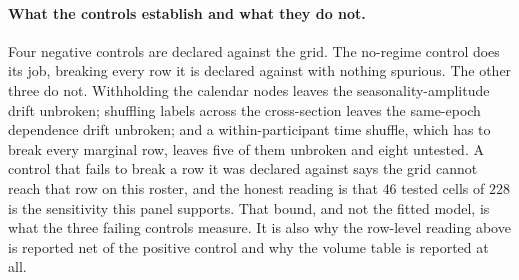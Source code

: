 \paragraph{What the controls establish and what they do not.}
Four negative controls are declared against the grid. The no-regime control
does its job, breaking every row it is declared against with nothing spurious.
The other three do not. Withholding the calendar nodes leaves the
seasonality-amplitude drift unbroken; shuffling labels across the cross-section
leaves the same-epoch dependence drift unbroken; and a within-participant time
shuffle, which has to break every marginal row, leaves five of them unbroken
and eight untested. A control that fails to break a row it was declared against
says the grid cannot reach that row on this roster, and the honest reading is
that $46$ tested cells of $228$ is the sensitivity this panel supports. That
bound, and not the fitted model, is what the three failing controls measure.
It is also why the row-level reading above is reported net of the positive
control and why the volume table is reported at all.
